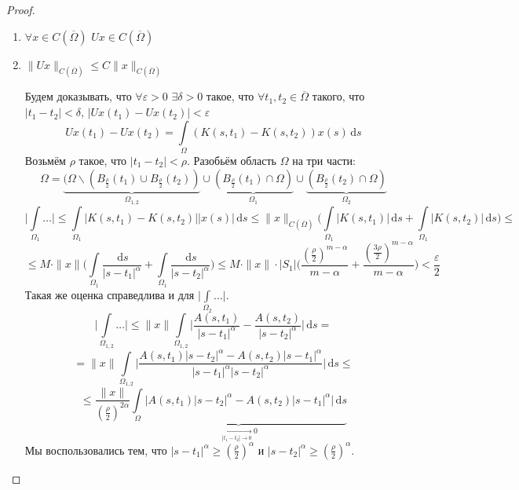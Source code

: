 \documentclass[11pt,openany,a4paper]{scrartcl}
\theoremstyle{plain}
\theoremstyle{definition}
\newcommand{\underto}[1]{\xrightarrow[#1]{}}
\newcommand{\dif}{\, \mathrm d}
\begin{document}
\begin{proof}
    \begin{enumerate}
        \item $\forall x \in C(\overline\Omega)$
        $Ux \in C(\overline\Omega)$
        \item $\|Ux\|_{C(\overline\Omega)} \leqslant C \|x\|_{C(\overline\Omega)}$
        
        Будем доказывать, что $\forall \varepsilon > 0$ $\exists \delta > 0$
        такое, что $\forall t_1, t_2 \in \overline\Omega$ такого, что
        $|t_1 - t_2| < \delta$, $|Ux(t_1) - Ux(t_2)| < \varepsilon$
        $$
        Ux(t_1) - Ux(t_2) = \int\limits_\Omega(K(s, t_1) - K(s, t_2))x(s)\dif s
        $$
        Возьмём $\rho$ такое, что $|t_1 - t_2| < \rho$.
        Разобьём область $\Omega$ на три части:
        $$
        \Omega = \underbrace{(\Omega \backslash (B_{\frac{\rho}{2}}(t_1)
        \cup B_{\frac{\rho}{2}}(t_2))}_{\Omega_{1,2}}
        \cup \underbrace{(B_{\frac{\rho}{2}}(t_1) \cap \Omega)}_{\Omega_1} \cup
        \underbrace{(B_{\frac{\rho}{2}}(t_2) \cap \Omega)}_{\Omega_2}
        $$
        $$
        \bigg|\int\limits_{\Omega_1}\ldots\bigg| \leqslant
        \int\limits_{\Omega_1} |K(s, t_1) - K(s, t_2)||x(s)|\dif s \leqslant
        \|x\|_{C(\overline\Omega)}\bigg(\int\limits_{\Omega_1}|K(s, t_1)|\dif s +
        \int\limits_{\Omega_1}|K(s, t_2)|\dif s\bigg) \leqslant
        $$
        $$
        \leqslant M \cdot \|x\|\bigg(\int\limits_{\Omega_1}
        \frac{\dif s}{|s - t_1|^\alpha} + \int\limits_{\Omega_1}
        \frac{\dif s}{|s - t_2|^\alpha}\bigg) \leqslant
        M \cdot \|x\|\cdot |S_1|
        \bigg(\frac{(\frac{\rho}{2})^{m - \alpha}}{m - \alpha} +
        \frac{(\frac{3\rho}{2})^{m - \alpha}}{m - \alpha}\bigg) < 
        \frac{\varepsilon}{2}
        $$
        Такая же оценка справедлива и для $\Big|\int\limits_{\Omega_2}\ldots\Big|$.
        $$
        \bigg|\int\limits_{\Omega_{1,2}}\ldots\bigg| \leqslant
        \|x\| \int\limits_{\Omega_{1,2}}\bigg|\frac{A(s, t_1)}{|s - t_1|^\alpha} -
        \frac{A(s, t_2)}{|s - t_2|^\alpha}\bigg|\dif s =
        $$
        $$
        = \|x\| \int\limits_{\Omega_{1,2}} \bigg|
        \frac{A(s, t_1)|s - t_2|^\alpha - A(s, t_2)|s - t_1|^\alpha}
        {|s - t_1|^\alpha|s - t_2|^\alpha}\bigg| \dif s \leqslant
        $$
        $$
        \leqslant
        \frac{\|x\|}{(\frac{\rho}{2})^{2\alpha}}
        \underbrace{\int\limits_\Omega \Big|A(s, t_1)|s - t_2|^\alpha -
        A(s, t_2)|s - t_1|^\alpha\Big| \dif s}_{\underto{|t_1 - t_2| \to 0} 0}
        $$
        Мы воспользовались тем, что $|s - t_1|^\alpha \geqslant (\frac{\rho}{2})^\alpha$ и
        $|s - t_2|^\alpha \geqslant (\frac{\rho}{2})^\alpha$.
        

\end{enumerate}
\end{proof}
\end{document}

